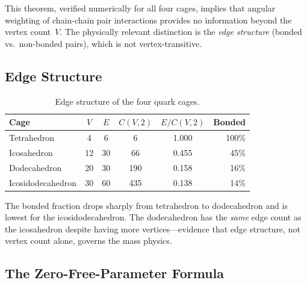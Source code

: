 \documentclass[11pt,letterpaper]{article}
\begin{document}
This theorem, verified numerically for all four cages, implies that
angular weighting of chain-chain pair interactions provides no
information beyond the vertex count~$V$.  The physically relevant
distinction is the \emph{edge structure} (bonded vs.\ non-bonded
pairs), which is not vertex-transitive.

\subsection{Edge Structure}

\begin{table}[H]
\centering
\caption{Edge structure of the four quark cages.}
\label{tab:edges}
\begin{tabular}{lccccr}
\toprule
Cage & $V$ & $E$ & $C(V,2)$ & $E/C(V,2)$ & Bonded \\
\midrule
Tetrahedron       &  4 &  6 &    6 & 1.000 & 100\% \\
Icosahedron       & 12 & 30 &   66 & 0.455 &  45\% \\
Dodecahedron      & 20 & 30 &  190 & 0.158 &  16\% \\
Icosidodecahedron & 30 & 60 &  435 & 0.138 &  14\% \\
\bottomrule
\end{tabular}
\end{table}

The bonded fraction drops sharply from tetrahedron to dodecahedron
and is lowest for the icosidodecahedron.  The dodecahedron has the
\emph{same} edge count as the icosahedron despite having more
vertices---evidence that edge structure, not vertex count alone,
governs the mass physics.

\subsection{The Zero-Free-Parameter Formula}
\end{document}
